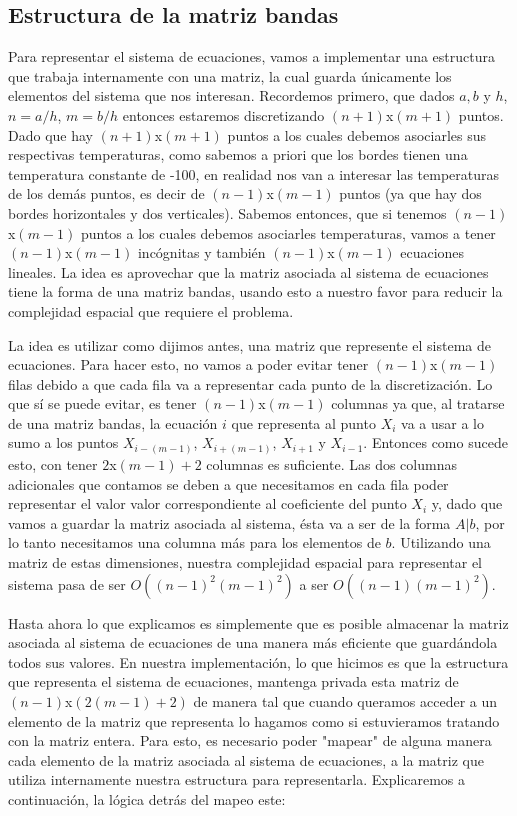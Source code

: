 \subsection{Estructura de la matriz bandas}
Para representar el sistema de ecuaciones, vamos a implementar una estructura que trabaja internamente con una matriz, la cual guarda únicamente los elementos del sistema que nos interesan. Recordemos primero, que dados $a, b$ y $h$, $n = a/h$, $m = b/h$ entonces estaremos discretizando $(n + 1)$x$(m + 1)$ puntos. 
Dado que hay $(n + 1)$x$(m + 1)$ puntos a los cuales debemos asociarles sus respectivas temperaturas, como sabemos a priori que los bordes tienen una temperatura constante de -100, en realidad nos van a interesar las temperaturas de los demás puntos, es decir de $(n - 1)$x$(m - 1)$ puntos (ya que hay dos bordes horizontales y dos verticales). Sabemos entonces, que si tenemos $(n - 1)$x$(m - 1)$ puntos a los cuales debemos asociarles temperaturas, vamos a tener $(n - 1)$x$(m - 1)$ incógnitas y también $(n - 1)$x$(m - 1)$ ecuaciones lineales. La idea es aprovechar que la matriz asociada al sistema de ecuaciones tiene la forma de una matriz bandas, usando esto a nuestro favor para reducir la complejidad espacial que requiere el problema.
\par La idea es utilizar como dijimos antes, una matriz que represente el sistema de ecuaciones. Para hacer esto, no vamos a poder evitar tener $(n - 1)$x$(m - 1)$ filas debido a que cada fila va a representar cada punto de la discretización. Lo que sí se puede evitar, es tener $(n - 1)$x$(m - 1)$ columnas ya que, al tratarse de una matriz bandas, la ecuación $i$ que representa al punto $X_i$ va a usar a lo sumo a los puntos $X_{i - (m - 1)}$, $X_{i + (m - 1)}$, $X_{i + 1}$ y $X_{i - 1}$. Entonces como sucede esto, con tener $2$x$(m - 1) + 2$ columnas es suficiente. Las dos columnas adicionales que contamos se deben a que necesitamos en cada fila poder representar el valor valor correspondiente al coeficiente del punto $X_i$ y, dado que vamos a guardar la matriz asociada al sistema, ésta va a ser de la forma $A|b$, por lo tanto necesitamos una columna más para los elementos de $b$. Utilizando una matriz de estas dimensiones, nuestra complejidad espacial para representar el sistema pasa de ser $O((n - 1)^2(m - 1)^2)$ a ser $O((n - 1)(m - 1)^2)$.
\par Hasta ahora lo que explicamos es simplemente que es posible almacenar la matriz asociada al sistema de ecuaciones de una manera más eficiente que guardándola todos sus valores. En nuestra implementación, lo que hicimos es que la estructura que representa el sistema de ecuaciones, mantenga privada esta matriz de $(n - 1)$x$(2(m - 1) + 2)$ de manera tal que cuando queramos acceder a un elemento de la matriz que representa lo hagamos como si estuvieramos tratando con la matriz entera. Para esto, es necesario poder "mapear" de alguna manera cada elemento de la matriz asociada al sistema de ecuaciones, a la matriz que utiliza internamente nuestra estructura para representarla. Explicaremos a continuación, la lógica detrás del mapeo este:
